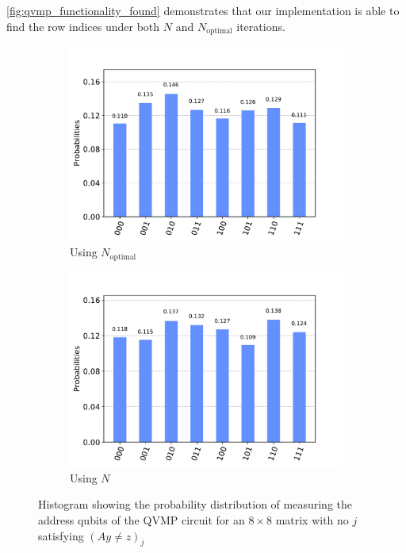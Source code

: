 \documentclass[11pt]{article}
\theoremstyle{definition}
\theoremstyle{remark}
\begin{document}
\cref{fig:qvmp_functionality_found} demonstrates that our implementation is able
to find the row indices under both $N$ and $N_{\text{optimal}}$ iterations.

\begin{figure}[h!]
  \centering
  \begin{subfigure}{0.48\textwidth}
    \includegraphics[width=\textwidth]{../results/figures/qvmp_functionality_none_known.pdf}
    \caption{Using $N_{\text{optimal}}$}
  \end{subfigure}
  \begin{subfigure}{0.48\textwidth}
    \centering
    \includegraphics[width=\textwidth]{../results/figures/qvmp_functionality_none_unknown.pdf}
    \caption{Using $N$}
  \end{subfigure}
  \caption{Histogram showing the probability distribution of measuring the
  address qubits of the QVMP circuit for an $8 \times 8$ matrix with no $j$
  satisfying $(Ay \neq z)_j$}
  \label{fig:qvmp_functionality_none}
\end{figure}
\end{document}
